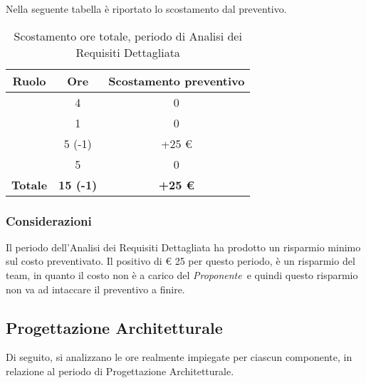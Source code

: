 Nella seguente tabella è riportato lo scostamento dal preventivo.

\begin{table}[H]
	\begin{center}
		\begin{tabular}{|c|c|c|}
			\hline
			\textbf{Ruolo}	& \textbf{Ore}	& \textbf{Scostamento preventivo} \\
			\hline
			\Res	&   4 	&  0  \\
			\hline
			\Amm	&   1	&  0	\\
			\hline
			\Ana	&   5 (-1)	&  +25 €	\\
			\hline
			\Ver	&   5	&  0	\\
			\hline
			\textbf{Totale} & \textbf{15 (-1)} & \textbf{+25 €}\\
			\hline
		\end{tabular}
	\end{center}
	\caption{Scostamento ore totale, periodo di Analisi dei Requisiti Dettagliata}
\end{table}

\subsubsection{Considerazioni}
Il periodo dell'Analisi dei Requisiti Dettagliata ha prodotto un risparmio minimo sul costo preventivato. Il positivo di € 25 per questo periodo, è un risparmio del team, in quanto il costo non è a carico del \textit{Proponente}\ e quindi questo risparmio non va ad intaccare il preventivo a finire.

\newpage
\subsection{Progettazione Architetturale}

Di seguito, si analizzano le ore realmente impiegate per ciascun componente, in relazione al periodo di Progettazione Architetturale.

